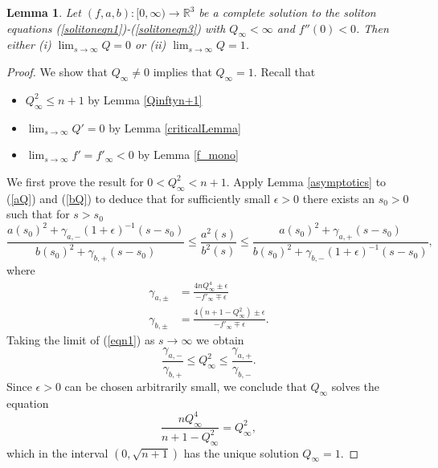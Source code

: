 \documentclass{amsart}
\newtheorem{lem}[thm]{Lemma}
\theoremstyle{definition}
\theoremstyle{remark}
\numberwithin{equation}{section}
\newcommand{\R}{\mathbb{R}}  %
\begin{document}
\begin{lem}
\label{Qlim}
Let $(f,a,b): [0,\infty) \rightarrow \R^3$ be a complete solution to the soliton equations (\ref{solitoneqn1})-(\ref{solitoneqn3}) with $Q_{\infty}<\infty$ and $f''(0) < 0$. Then either (i) $\lim_{s \rightarrow \infty} Q = 0$ or (ii) $\lim_{s \rightarrow \infty} Q = 1$.
\end{lem}
\begin{proof}
We show that $Q_{\infty} \neq 0$ implies that $Q_{\infty} = 1$. Recall that
\begin{itemize}
\item $Q^2_{\infty} \leq n+1$ by Lemma \ref{Qinftyn+1}
\item $\lim_{s \rightarrow \infty} Q' = 0$ by Lemma \ref{criticalLemma}
\item $\lim_{s \rightarrow \infty} f' = f'_{\infty} < 0$ by Lemma \ref{f_mono}
\end{itemize}


We first prove the result for $0 < Q^2_{\infty} < n+1$. Apply Lemma \ref{asymptotics} to (\ref{aQ}) and (\ref{bQ}) to deduce that for sufficiently small $\epsilon >0$ there exists an $s_0> 0$ such that for $s>s_0$
\begin{equation}
\label{eqn1}
\frac{a(s_0)^2 + \gamma_{a,-}\left(1+\epsilon\right)^{-1} \left(s-s_0\right)}{b(s_0)^2 + \gamma_{b,+} \left(s-s_0\right)}
\leq \frac{a^2(s)}{b^2(s)} \leq  \frac{a(s_0)^2 + \gamma_{a,+} \left(s-s_0\right)}{b(s_0)^2 + \gamma_{b,-}\left(1+\epsilon\right)^{-1} \left(s-s_0\right)},  
\end{equation}
where
\begin{align*}
\gamma_{a, \pm} &= \frac{4nQ_{\infty}^4 \pm \epsilon} {-f'_{\infty}\mp \epsilon} \\
\gamma_{b, \pm} &= \frac{4(n+1-Q_{\infty}^2) \pm \epsilon} {-f'_{\infty}\mp \epsilon}.
\end{align*}
Taking the limit of (\ref{eqn1}) as $s \rightarrow \infty$ we obtain 
\begin{equation*}
\frac{\gamma_{a,-}}{\gamma_{b,+}} \leq Q_{\infty}^2 \leq \frac{\gamma_{a,+}}{\gamma_{b,-}}. 
\end{equation*}
Since $\epsilon >0$ can be chosen arbitrarily small, we conclude that $Q_{\infty}$ solves the equation 
\begin{equation*}
\frac{nQ_{\infty}^4}{n+1-Q_{\infty}^2} = Q^2_{\infty},
\end{equation*}
which in the interval $(0,\sqrt{n+1})$ has the unique solution $Q_{\infty}=1$.


\end{proof}
\end{document}
